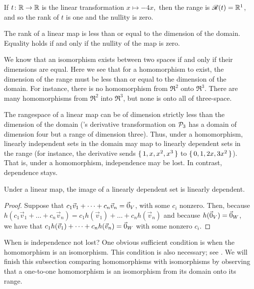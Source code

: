 \begin{example}
If \( \mbox{$t\colon \mathbb{R}\to \mathbb{R}$} \) is the linear transformation \( x\mapsto -4x, \)
then the range is \(  \mathscr{R}(t)=\mathbb{R}^1 \), and so 
the rank of $t$ is one and the nullity is zero.
\end{example}

\begin{corollary}
\label{cor:RankDecreases}
The rank of a linear map is less than or equal to the dimension of the domain.
Equality holds if and only if the nullity of the map is zero.
\end{corollary}

We  know 
that an isomorphism exists between two spaces 
if and only if their dimensions are equal.
Here we see that for a homomorphism to exist,  
the dimension of the range must be less than or equal to the 
dimension of the domain.
For instance, there is no homomorphism
from \( \Re^2 \) onto \( \Re^3 \).
There are many homomorphisms
from \( \Re^2 \) into \( \Re^3 \), but none is onto all 
of three-space.

The rangespace of a linear map can be of dimension strictly less than 
the dimension of the domain
('s derivative transformation on $\mathcal{P}_3$
has a domain of dimension four but a range of dimension three).
Thus, under a homomorphism, 
linearly independent sets in the domain
may map to linearly dependent sets in the range
(for instance, the derivative sends
$\mbox{$\{\,1,x,x^2,x^3\,\}$}$ to $\mbox{$\{\,0,1,2x,3x^2\,\}$}$).
That is, under a homomorphism, independence may be lost.
In contrast, dependence stays.

\begin{lemma}
Under a linear map, the image of a linearly dependent set is linearly
dependent.
\end{lemma}

\begin{proof}
Suppose that \( c_1\vec{v}_1+\dots+c_n\vec{v}_n=\vec{0}_V \),
with some $c_i$ nonzero.
Then, because
\( h(c_1\vec{v}_1+\dots+c_n\vec{v}_n)=c_1h(\vec{v}_1)+\dots+c_nh(\vec{v}_n) \)
and because \( h(\vec{0}_V)=\vec{0}_W \),
we have that $c_1h(\vec{v}_1)+\dots+c_nh(\vec{v}_n)=\vec{0}_W$ with some nonzero 
$c_i$.
\end{proof}

When is independence not lost?
One obvious sufficient condition is when the homomorphism is an isomorphism.
This condition is also necessary; 
see .
We will finish this subsection comparing homomorphisms with isomorphisms 
by observing that
a one-to-one homomorphism is an isomorphism from its domain onto its range.

